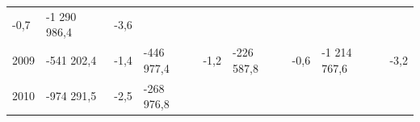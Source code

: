 \begin{longtable}[]{@{}lllllllll@{}}
\begin{minipage}[t]{0.06\columnwidth}
-0,7\strut
\end{minipage} & \begin{minipage}[t]{0.10\columnwidth}\raggedright
-1 290 986,4\strut
\end{minipage} & \begin{minipage}[t]{0.06\columnwidth}\raggedright
-3,6\strut
\end{minipage}\tabularnewline
\begin{minipage}[t]{0.05\columnwidth}\raggedright
2009\strut
\end{minipage} & \begin{minipage}[t]{0.10\columnwidth}\raggedright
-541 202,4\strut
\end{minipage} & \begin{minipage}[t]{0.06\columnwidth}\raggedright
-1,4\strut
\end{minipage} & \begin{minipage}[t]{0.16\columnwidth}\raggedright
-446 977,4\strut
\end{minipage} & \begin{minipage}[t]{0.06\columnwidth}\raggedright
-1,2\strut
\end{minipage} & \begin{minipage}[t]{0.12\columnwidth}\raggedright
-226 587,8\strut
\end{minipage} & \begin{minipage}[t]{0.06\columnwidth}\raggedright
-0,6\strut
\end{minipage} & \begin{minipage}[t]{0.10\columnwidth}\raggedright
-1 214 767,6\strut
\end{minipage} & \begin{minipage}[t]{0.06\columnwidth}\raggedright
-3,2\strut
\end{minipage}\tabularnewline
\begin{minipage}[t]{0.05\columnwidth}\raggedright
2010\strut
\end{minipage} & \begin{minipage}[t]{0.10\columnwidth}\raggedright
-974 291,5\strut
\end{minipage} & \begin{minipage}[t]{0.06\columnwidth}\raggedright
-2,5\strut
\end{minipage} & \begin{minipage}[t]{0.16\columnwidth}\raggedright
-268 976,8\strut
\end{minipage} & \begin{minipage}[t]{0.06\columnwidth}\raggedright

\end{minipage}
\end{longtable}
